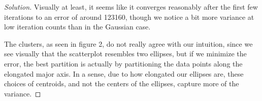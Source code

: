 \documentclass[10pt]{article}
\begin{document}
\begin{proof}[Solution]
Visually at least, it seems like it converges reasonably after the first few iterations to an error of around 123160, though we notice a bit more variance at low iteration counts than in the Gaussian case.

The clusters, as seen in figure 2, do not really agree with our intuition, since we see visually that the scatterplot resembles two ellipses, but if we minimize the error, the best partition is actually by partitioning the data points along the elongated major axis. In a sense, due to how elongated our ellipses are, these choices of centroids, and not the centers of the ellipses, capture more of the variance.


\end{proof}
\end{document}
